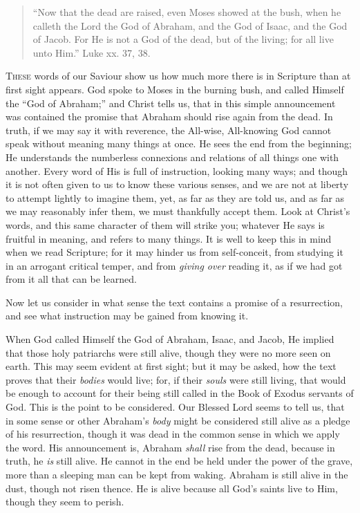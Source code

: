 
\begin{quote}

``Now that the dead are raised, even Moses
showed at the bush, when he calleth the Lord the God
of Abraham, and the God of Isaac, and the God of
Jacob. For He is not a God of the dead, but of the
living; for all live unto Him.'' Luke xx. 37, 38.

\end{quote}

T\textsc{hese} words of our Saviour show us how much more there
is in Scripture than at first sight appears. God spoke to
Moses in the burning bush, and called Himself the
``God of Abraham;'' and Christ tells us, that in
this simple announcement was contained the promise that
Abraham should rise again from the dead. In truth, if we
may say it with reverence, the All-wise, All-knowing God
cannot speak without meaning many things at once. He sees
the end from the beginning; He understands the numberless
connexions and relations of all things one with another.
Every word of His is full of instruction, looking many
ways; and though it is not often given to us to know
these various senses, and we are not at liberty to
attempt lightly to imagine them, yet, as far as they are
told us, and as far as we may reasonably infer them, we
must thankfully accept them. Look at Christ's words, and
this same character of them will strike you; whatever He
says is fruitful in meaning, and refers to many things.
It is well to keep this in mind when we read Scripture;
for it may hinder us from self-conceit, from studying it
in an arrogant critical temper, and from \emph{giving over}
reading it, as if we had got from it all that can be
learned.

Now let us consider in what sense the text contains a
promise of a resurrection, and see what instruction may
be gained from knowing it.

When God called Himself the God of Abraham, Isaac, and
Jacob, He implied that those holy patriarchs were still
alive, though they were no more seen on earth. This may
seem evident at first sight; but it may be asked, how the
text proves that their \emph{bodies} would live; for, if
their \emph{souls} were still living, that would be
enough to account for their being still called in the
Book of Exodus servants of God. This is the point to be
considered. Our Blessed Lord seems to tell us, that in
some sense or other Abraham's \emph{body} might be
considered still alive as a pledge of his resurrection,
though it was dead in the common sense in which we apply
the word. His announcement is, Abraham \emph{shall} rise
from the dead, because in truth, he \emph{is} still
alive. He cannot in the end be held under the power of
the grave, more than a sleeping man can be kept from
waking. Abraham is still alive in the dust, though not
risen thence. He is alive because all God's saints live
to Him, though they seem to perish.

